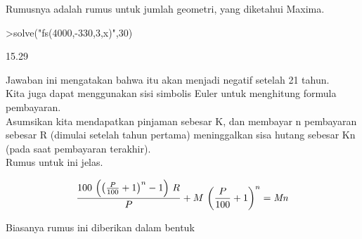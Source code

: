 \documentclass[a4paper,10pt]{article}
\begin{document}
\begin{eulernotebook}
\begin{eulercomment}
\begin{eulercomment}
\begin{eulercomment}
\begin{eulercomment}
\begin{eulercomment}
Rumusnya adalah rumus untuk jumlah geometri, yang diketahui Maxima.
\end{eulercomment}
\begin{eulerprompt}
>solve("fs(4000,-330,3,x)",30)
\end{eulerprompt}
\begin{euleroutput}
        15.29 
\end{euleroutput}
\begin{eulercomment}
Jawaban ini mengatakan bahwa itu akan menjadi negatif setelah 21
tahun.\\
Kita juga dapat menggunakan sisi simbolis Euler untuk menghitung
formula pembayaran.\\
Asumsikan kita mendapatkan pinjaman sebesar K, dan membayar n
pembayaran sebesar R (dimulai setelah tahun pertama) meninggalkan sisa
hutang sebesar Kn (pada saat pembayaran terakhir).\\
Rumus untuk ini jelas.
\end{eulercomment}
\begin{eulerformula}
\[
\frac{100\,\left(\left(\frac{P}{100}+1\right)^{n}-1\right)\,R}{P}+M  \,\left(\frac{P}{100}+1\right)^{n}={\it Mn}
\]
\end{eulerformula}
\begin{eulercomment}
Biasanya rumus ini diberikan dalam bentuk


\end{eulercomment}
\end{eulercomment}
\end{eulercomment}
\end{eulercomment}
\end{eulercomment}
\end{eulernotebook}
\end{document}
